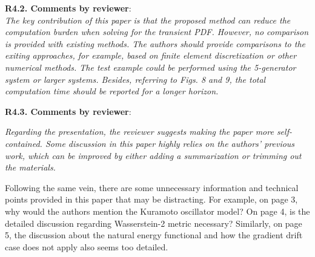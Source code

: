 \documentclass[12pt,onecolumn]{IEEEtran}
\newcommand{\blue}{\color{blue}}
\newcommand{\nib}{\noindent  {\bf Response:} }
\begin{document}
\noindent
{\bf R4.2. Comments by reviewer}:\\
{\em The key contribution of this paper is that the proposed method can reduce the computation burden when solving for the transient PDF. However, no comparison is provided with existing methods. The authors should provide comparisons to the exiting approaches, for example, based on finite element discretization or other numerical methods. The test example could be performed using the 5-generator system or larger systems. Besides, referring to Figs. 8 and 9, the total computation time should be reported for a longer horizon.}

{\nib \blue{TBD.}}


\noindent
{\bf R4.3. Comments by reviewer}:\\
{\em Regarding the presentation, the reviewer suggests making the paper more self-contained. Some discussion in this paper highly relies on the authors' previous work, which can be improved by either adding a summarization or trimming out the materials.

Following the same vein, there are some unnecessary information and technical points provided in this paper that may be distracting.
For example, on page 3, why would the authors mention the Kuramoto oscillator model?
On page 4, is the detailed discussion regarding Wasserstein-2 metric necessary? Similarly, on page 5, the discussion about the natural energy functional and how the gradient drift case does not apply also seems too detailed.}
\end{document}
